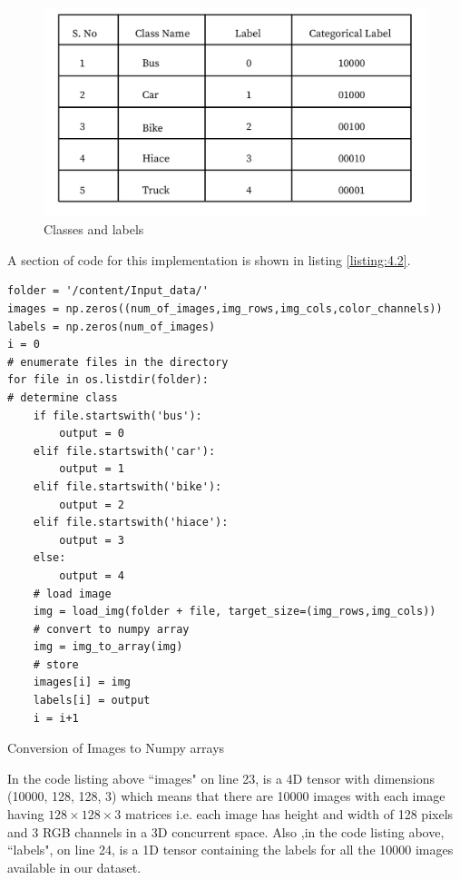 \begin{figure}[H]
    \centering
    \captionsetup{justification = centering}
    \includegraphics[scale = 0.2]{CHAPTERS/Chapter-4/Images/class_label-01}
    \caption{Classes and labels} 
    \label{fig:class_labels}
  \end{figure}

\noindent A section of code for this implementation is shown in listing \ref{listing:4.2}.

\begin{longlisting}
    \begin{verbatim}
folder = '/content/Input_data/'
images = np.zeros((num_of_images,img_rows,img_cols,color_channels))
labels = np.zeros(num_of_images)
i = 0
# enumerate files in the directory
for file in os.listdir(folder):
# determine class
    if file.startswith('bus'):
        output = 0
    elif file.startswith('car'):
        output = 1
    elif file.startswith('bike'):
        output = 2
    elif file.startswith('hiace'):
        output = 3
    else:
        output = 4
    # load image
    img = load_img(folder + file, target_size=(img_rows,img_cols))
    # convert to numpy array
    img = img_to_array(img)
    # store
    images[i] = img
    labels[i] = output
    i = i+1
\end{verbatim}

\caption{Conversion of Images to Numpy arrays}
\label{listing:4.2}
\end{longlisting}
In the code listing above ``images" on line 23, is a 4D tensor with
dimensions (10000, 128, 128, 3) which means that there are 10000
images with each image having $128\times 128\times 3$ matrices i.e.
each image has height and width of 128 pixels and 3 RGB channels in a
3D concurrent space. Also ,in the code listing above,
``labels", on line 24, is a 1D tensor containing the labels
for all the 10000 images available in our dataset.
